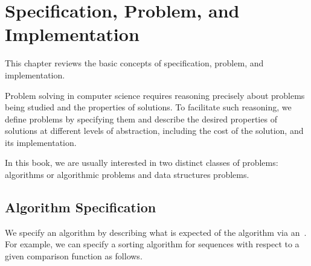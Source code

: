\chapter{Specification, Problem, and Implementation}
\label{ch:introduction::spec}

\begin{cluster}
\label{grp:prmbl:introduction::spec::reviews}

\begin{preamble}
\label{prmbl:introduction::spec::reviews}
This chapter reviews the basic concepts of specification, problem, and
implementation.

\end{preamble}
\end{cluster}

\begin{cluster}
\label{grp:grm:introduction::spec::solving}

\begin{gram}
\label{grm:introduction::spec::solving}
Problem solving in computer science requires reasoning precisely about
problems being studied and the properties of solutions.
To facilitate such reasoning,  we define problems by
specifying them and describe the desired properties of solutions at
different levels of abstraction, including the cost of the solution, and its
implementation.

In this book, we are usually interested in two distinct classes of
problems: algorithms or algorithmic problems and data structures
problems.

\end{gram}
\end{cluster}


\section{Algorithm Specification}
\label{sec:introduction::spec::algorithm-specification}

\begin{cluster}
\label{grp:grm:introduction::spec::specify}

\begin{gram}
\label{grm:introduction::spec::specify}
We specify an algorithm by describing what is expected of the
algorithm via an~.
For example, we can specify a sorting algorithm for sequences with
respect to a given comparison function as follows.

\end{gram}
\end{cluster}

